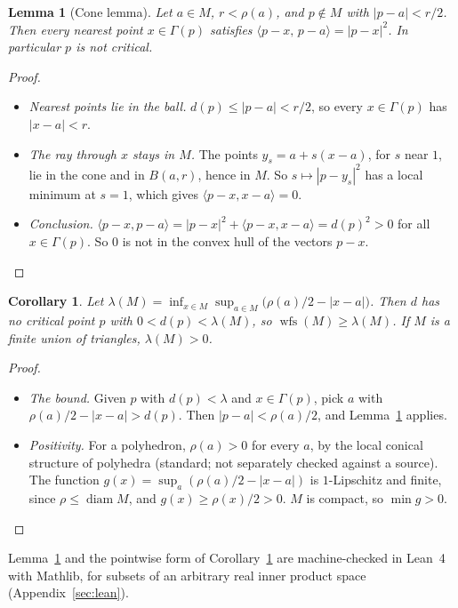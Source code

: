 \documentclass[preprint,12pt]{elsarticle}
\newtheorem{lemma}[theorem]{Lemma}
\newtheorem{corollary}[theorem]{Corollary}
\theoremstyle{definition}
\theoremstyle{remark}
\newcommand{\wfs}{\operatorname{wfs}}
\begin{document}
\begin{lemma}[Cone lemma]\label{lem:cone}
Let $a\in M$, $r<\rho(a)$, and $p\notin M$ with $|p-a|<r/2$. Then every nearest point $x\in\Gamma(p)$ satisfies
$\langle p-x,\,p-a\rangle=|p-x|^2$. In particular $p$ is not critical.
\end{lemma}
\begin{proof}
\begin{itemize}
\item \emph{Nearest points lie in the ball.} $d(p)\le|p-a|<r/2$, so every $x\in\Gamma(p)$ has $|x-a|<r$.
\item \emph{The ray through $x$ stays in $M$.} The points $y_s=a+s(x-a)$, for $s$ near $1$, lie in the cone and
in $B(a,r)$, hence in $M$. So $s\mapsto|p-y_s|^2$ has a local minimum at $s=1$, which gives $\langle
p-x,x-a\rangle=0$.
\item \emph{Conclusion.} $\langle p-x,p-a\rangle=|p-x|^2+\langle p-x,x-a\rangle=d(p)^2>0$ for all
$x\in\Gamma(p)$. So $0$ is not in the convex hull of the vectors $p-x$.
\end{itemize}
\end{proof}

\begin{corollary}\label{cor:lambda}
Let $\lambda(M)=\inf_{x\in M}\sup_{a\in M}\bigl(\rho(a)/2-|x-a|\bigr)$. Then $d$ has no critical point $p$ with
$0<d(p)<\lambda(M)$, so $\wfs(M)\ge\lambda(M)$. If $M$ is a finite union of triangles, $\lambda(M)>0$.
\end{corollary}
\begin{proof}
\begin{itemize}
\item \emph{The bound.} Given $p$ with $d(p)<\lambda$ and $x\in\Gamma(p)$, pick $a$ with
$\rho(a)/2-|x-a|>d(p)$. Then $|p-a|<\rho(a)/2$, and Lemma~\ref{lem:cone} applies.
\item \emph{Positivity.} For a polyhedron, $\rho(a)>0$ for every $a$, by the local conical structure of
polyhedra (standard; not separately checked against a source). The function $g(x)=\sup_a(\rho(a)/2-|x-a|)$
is $1$-Lipschitz and finite, since $\rho\le\operatorname{diam}M$, and $g(x)\ge\rho(x)/2>0$. $M$ is compact, so
$\min g>0$.
\end{itemize}
\end{proof}

Lemma~\ref{lem:cone} and the pointwise form of Corollary~\ref{cor:lambda} are machine-checked in Lean~4 with
Mathlib, for subsets of an arbitrary real inner product space (Appendix~\ref{sec:lean}).
\end{document}
